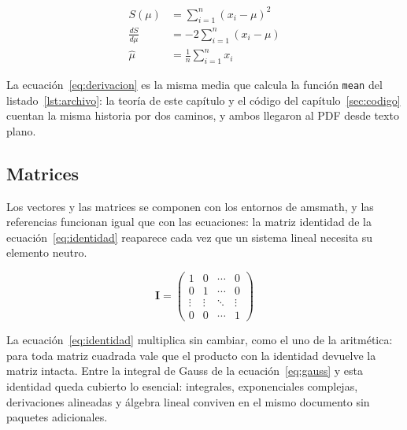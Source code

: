 \begin{align}
  S(\mu) &= \sum_{i=1}^{n}(x_i - \mu)^2 \nonumber \\
  \frac{dS}{d\mu} &= -2\sum_{i=1}^{n}(x_i - \mu) \nonumber \\
  \hat{\mu} &= \frac{1}{n}\sum_{i=1}^{n}x_i \label{eq:derivacion}
\end{align}

La ecuación~\eqref{eq:derivacion} es la misma media que calcula la
función \texttt{mean} del listado~\ref{lst:archivo}: la teoría de este
capítulo y el código del capítulo~\ref{sec:codigo} cuentan la misma
historia por dos caminos, y ambos llegaron al PDF desde texto plano.

\subsection{Matrices}

Los vectores y las matrices se componen con los entornos de amsmath, y las
referencias funcionan igual que con las ecuaciones: la matriz identidad de
la ecuación~\eqref{eq:identidad} reaparece cada vez que un sistema lineal
necesita su elemento neutro.

\begin{equation}\label{eq:identidad}
  \mathbf{I} = \begin{pmatrix}
    1 & 0 & \cdots & 0 \\
    0 & 1 & \cdots & 0 \\
    \vdots & \vdots & \ddots & \vdots \\
    0 & 0 & \cdots & 1
  \end{pmatrix}
\end{equation}

La ecuación~\eqref{eq:identidad} multiplica sin cambiar, como el uno de la
aritmética: para toda matriz cuadrada vale que el producto con la identidad
devuelve la matriz intacta. Entre la integral de Gauss de la
ecuación~\eqref{eq:gauss} y esta identidad queda cubierto lo esencial:
integrales, exponenciales complejas, derivaciones alineadas y álgebra lineal
conviven en el mismo documento sin paquetes adicionales.
